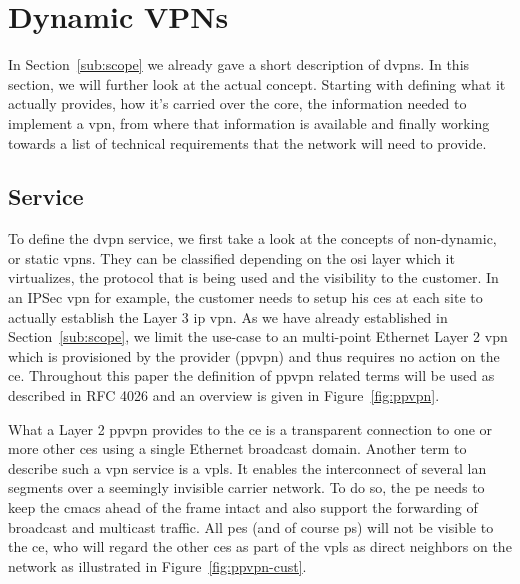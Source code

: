 \section{Dynamic VPNs} %
\label{sec:dvpns}

In Section~\ref{sub:scope} we already gave a short description of \acp{dvpn}. In this section, we will further look at the actual concept. Starting with defining what it actually provides, how it's carried over the core, the information needed to implement a \ac{vpn}, from where that information is available and finally working towards a list of technical requirements that the network will need to provide.

\subsection{Service} %
\label{sub:service}

To define the \ac{dvpn} service, we first take a look at the concepts of non-dynamic, or static \acp{vpn}. They can be classified depending on the \acs{osi} layer which it virtualizes, the protocol that is being used and the visibility to the customer. In an IPSec \ac{vpn} for example, the customer needs to setup his \acp{ce} at each site to actually establish the Layer 3 \acs{ip} \ac{vpn}. As we have already established in Section~\ref{sub:scope}, we limit the use-case to an multi-point Ethernet Layer 2 \ac{vpn} which is provisioned by the provider (\acs{ppvpn}) and thus requires no action on the \ac{ce}. Throughout this paper the definition of \ac{ppvpn} related terms will be used as described in RFC 4026 \cite{vpn-terms} and an overview is given in Figure~\ref{fig:ppvpn}.

What a Layer 2 \ac{ppvpn} provides to the \ac{ce} is a transparent connection to one or more other \acp{ce} using a single Ethernet broadcast domain. Another term to describe such a \ac{vpn} service is a \ac{vpls}. It enables the interconnect of several \acs{lan} segments over a seemingly invisible carrier network. To do so, the \ac{pe} needs to keep the \acp{cmac} ahead of the frame intact and also support the forwarding of broadcast and multicast traffic. All \acp{pe} (and of course \acp{p}) will not be visible to the \ac{ce}, who will regard the other \acp{ce} as part of the \ac{vpls} as direct neighbors on the network as illustrated in Figure~\ref{fig:ppvpn-cust}. 

